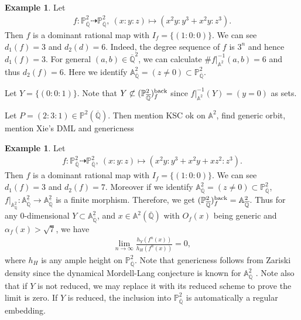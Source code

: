\documentclass[12pt]{amsart}
\theoremstyle{plain}
\theoremstyle{definition}
\newtheorem{example}[theorem]{Example}
\numberwithin{equation}{section}
\def\P{{\mathbb P}}
\def\A{{\mathbb A}}
\def\QQ{\overline{\mathbb Q}}
\begin{document}
\begin{example}
Let
\begin{align}
f \colon \P^{2}_{\QQ} \dashrightarrow \P^{2}_{\QQ},\ (x:y:z) \mapsto (x^{2}y : y^{3} + x^{2}y : z^{3}).
\end{align}
Then $f$ is a dominant rational map with $I_{f}=\{(1:0:0)\}$.
We can see $d_{1}(f) = 3$ and $d_{2}(d) = 6$.
Indeed, the degree sequence of $f$ is $3^{n}$ and hence $d_{1}(f) = 3$.
For general $(a, b) \in \QQ^{2}$, we can calculate $\# f|_{\A^{2}}^{-1}(a,b) = 6$ and thus $d_{2}(f)=6$.
Here we identify $\A^{2}_{\QQ} = (z \neq 0) \subset \P^{2}_{\QQ}$.

Let $Y = \{(0:0:1)\}$.
Note that $Y \not\subset (\P^{2}_{\QQ})_{f}^{\rm back}$ since $f|_{\A^{2}}^{-1}(Y) = (y=0)$ as sets.

Let $P = (2:3:1) \in \P^{2}(\QQ)$.
Then 
{\color{red} mention KSC ok on $\A^{2}$, find generic orbit, mention Xie's DML and genericness \cite{Xi17}}
\end{example}
\fi

\begin{example}\label{ex:A2}
Let
\begin{align}
f \colon \P^{2}_{\QQ} \dashrightarrow \P^{2}_{\QQ},\ (x:y:z) \mapsto (x^{2}y : y^{3} + x^{2}y+xz^{2} : z^{3}).
\end{align}
Then $f$ is a dominant rational map with $I_{f}=\{(1:0:0)\}$.
We can see $d_{1}(f) = 3$ and $d_{2}(f) = 7$.
Moreover if we identify $\A^{2}_{\QQ} = (z \neq 0) \subset \P^{2}_{\QQ}$,
$f|_{\A^{2}_{\QQ}} \colon \A^{2}_{\QQ} \longrightarrow \A^{2}_{\QQ}$ is a finite morphism.
Therefore, we get $(\P^{2}_{\QQ})_{f}^{\rm back} = \A^{2}_{\QQ}$.
Thus for any $0$-dimensional $Y \subset \A^{2}_{\QQ}$, and $x \in \A^{2}(\QQ)$ with
$O_{f}(x)$ being generic and $ \alpha_{f}(x) > \sqrt{7}$, we have
\begin{align}
\lim_{n \to \infty} \frac{h_{Y}(f^{n}(x))}{h_{H}(f^{n}(x))} = 0,
\end{align}
where $h_{H}$ is any ample height on $\P^{2}_{\QQ}$.
Note that genericness follows from Zariski density since the dynamical Mordell-Lang conjecture 
is known for $\A^{2}_{\QQ}$ \cite{Xi17}.
Note also that if $Y$ is not reduced, we may replace it with its reduced scheme to prove the limit is zero.
If $Y$ is reduced, the inclusion into $\P^{2}_{\QQ}$ is automatically a regular embedding.
\end{example}
\end{document}
